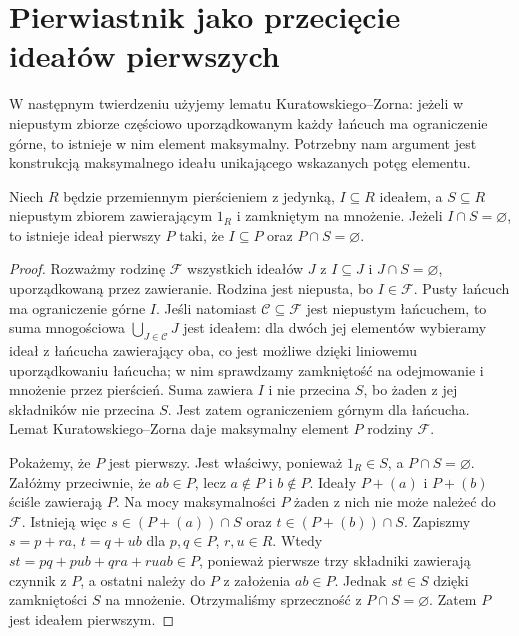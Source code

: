 \section{Pierwiastnik jako przecięcie ideałów pierwszych}
W następnym twierdzeniu użyjemy lematu Kuratowskiego--Zorna:
jeżeli w niepustym zbiorze częściowo uporządkowanym każdy
łańcuch ma ograniczenie górne, to istnieje w nim element
maksymalny. Potrzebny nam argument jest konstrukcją
maksymalnego ideału unikającego wskazanych potęg elementu.

\begin{lemat}
\label{aa:lem:prime-avoid-S}
Niech $R$ będzie przemiennym pierścieniem z jedynką,
$I\subseteq R$ ideałem, a $S\subseteq R$ niepustym zbiorem
zawierającym $1_R$ i zamkniętym na mnożenie.
Jeżeli $I\cap S=\varnothing$, to istnieje ideał
pierwszy $P$ taki, że $I\subseteq P$ oraz
$P\cap S=\varnothing$.
\end{lemat}
\begin{proof}
Rozważmy rodzinę $\mathcal F$ wszystkich ideałów
$J$ z $I\subseteq J$ i $J\cap S=\varnothing$,
uporządkowaną przez zawieranie. Rodzina jest niepusta,
bo $I\in\mathcal F$. Pusty łańcuch ma ograniczenie
górne $I$. Jeśli natomiast $\mathcal C\subseteq\mathcal F$
jest niepustym łańcuchem, to suma mnogościowa
$\bigcup_{J\in\mathcal C}J$ jest ideałem: dla dwóch jej elementów wybieramy ideał
z łańcucha zawierający oba, co jest możliwe dzięki
liniowemu uporządkowaniu łańcucha; w nim sprawdzamy
zamkniętość na odejmowanie i mnożenie przez pierścień.
Suma zawiera $I$ i nie przecina $S$, bo żaden z jej
składników nie przecina $S$. Jest zatem ograniczeniem
górnym dla łańcucha. Lemat Kuratowskiego--Zorna daje
maksymalny element $P$ rodziny $\mathcal F$.

Pokażemy, że $P$ jest pierwszy. Jest właściwy, ponieważ
$1_R\in S$, a $P\cap S=\varnothing$.
Załóżmy przeciwnie, że $ab\in P$, lecz $a\notin P$
i $b\notin P$. Ideały $P+(a)$ i $P+(b)$ ściśle
zawierają $P$. Na mocy maksymalności $P$ żaden
z nich nie może należeć do $\mathcal F$.
Istnieją więc $s\in(P+(a))\cap S$ oraz
$t\in(P+(b))\cap S$. Zapiszmy
$s=p+ra$, $t=q+ub$ dla $p,q\in P$, $r,u\in R$.
Wtedy $st=pq+pub+qra+ruab\in P$, ponieważ
pierwsze trzy składniki zawierają czynnik z $P$,
a ostatni należy do $P$ z założenia $ab\in P$.
Jednak $st\in S$ dzięki zamkniętości $S$ na mnożenie.
Otrzymaliśmy sprzeczność z $P\cap S=\varnothing$.
Zatem $P$ jest ideałem pierwszym.
\end{proof}

